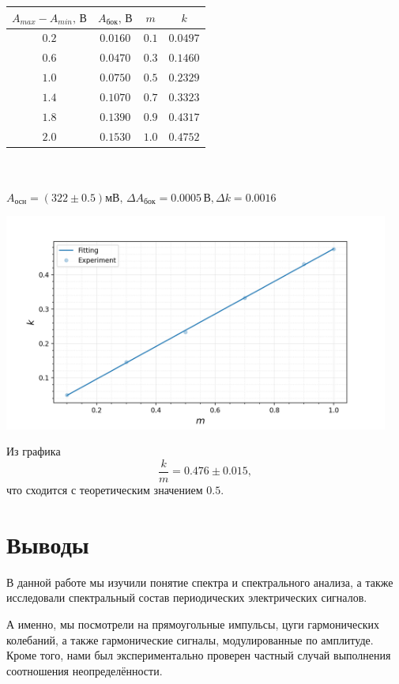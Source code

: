 \begin{center}
\begin{tabular}{|c|c|c|c|}\hline
$A_{max}-A_{min}\text{, В}$&$A_\text{бок}\text{, В}$&$m$&$k$\\\hline
$0.2$&$0.0160$&$0.1$&$0.0497$\\\hline
$0.6$&$0.0470$&$0.3$&$0.1460$\\\hline
$1.0$&$0.0750$&$0.5$&$0.2329$\\\hline
$1.4$&$0.1070$&$0.7$&$0.3323$\\\hline
$1.8$&$0.1390$&$0.9$&$0.4317$\\\hline
$2.0$&$0.1530$&$1.0$&$0.4752$\\\hline
\end{tabular}\\~\\
$A_\text{осн} = (322\pm0.5)\text{мВ},\,\Delta A_\text{бок}=0.0005\,\text{В},\Delta k=0.0016\,\text{}$
\end{center}
\begin{center}
\includegraphics[width=0.95\textwidth]{images/plot2.png}
\end{center}
Из графика
$$\frac{k}{m} = 0.476\pm0.015,$$
что сходится с теоретическим значением $0.5$.

\section{Выводы}
В данной работе мы изучили понятие спектра и спектрального анализа, а также исследовали спектральный состав периодических электрических сигналов. 

А именно, мы посмотрели на прямоугольные импульсы, цуги гармонических колебаний, а также гармонические сигналы, модулированные по амплитуде. Кроме того, нами был экспериментально проверен частный случай выполнения соотношения неопределённости. 


